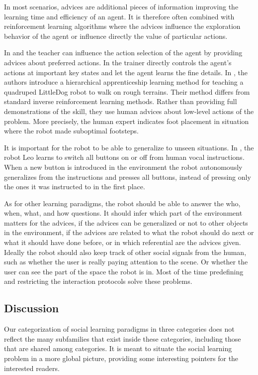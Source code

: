 In most scenarios, advices are additional pieces of information improving the learning time and efficiency of an agent. It is therefore often combined with reinforcement learning algorithms where the advices influence the exploration behavior of the agent or influence directly the value of particular actions. 

In \cite{clouse1992teaching} and \cite{maclin2005giving} the teacher can influence the action selection of the agent by providing advices about preferred actions. In  \cite{smart2002effective} the trainer directly controls the agent's actions at important key states and let the agent learns the fine details. In \cite{kolter2007hierarchical}, the authors introduce a hierarchical apprenticeship learning method for teaching a quadruped LittleDog robot to walk on rough terrains. Their method differs from standard inverse reinforcement learning methods. Rather than providing full demonstrations of the skill, they use human advices about low-level actions of the problem. More precisely, the human expert indicates foot placement in situation where the robot made suboptimal footsteps.

It is important for the robot to be able to generalize to unseen situations. In \cite{lockerd2004tutelage}, the robot Leo learns to switch all buttons on or off from human vocal instructions. When a new button is introduced in the environment the robot autonomously generalizes from the instructions and presses all buttons, instead of pressing only the ones it was instructed to in the first place.


As for other learning paradigms, the robot should be able to answer the who, when, what, and how questions. It should infer which part of the environment matters for the advices, if the advices can be generalized or not to other objects in the environment, if the advices are related to what the robot should do next or what it should have done before, or in which referential are the advices given. Ideally the robot should also keep track of other social signals from the human, such as whether the user is really paying attention to the scene.  Or whether the user can see the part of the space the robot is in. Most of the time predefining and restricting the interaction protocols solve these problems.

\subsection{Discussion}

Our categorization of social learning paradigms in three categories does not reflect the many subfamilies that exist inside these categories, including those that are shared among categories. It is meant to situate the social learning problem in a more global picture, providing some interesting pointers for the interested readers. 

